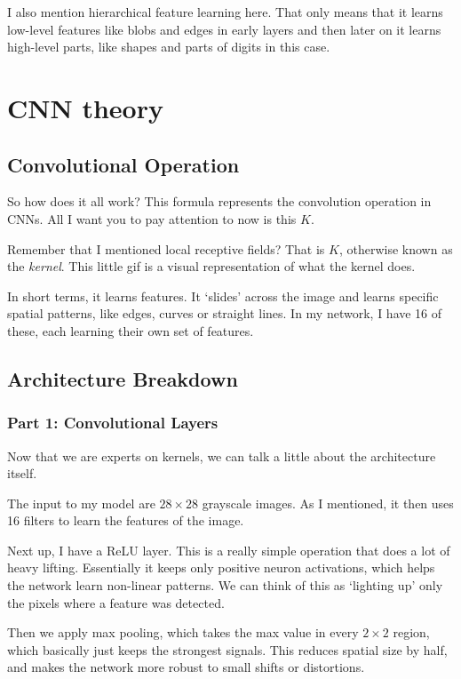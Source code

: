\documentclass{article}
\begin{document}
I also mention hierarchical feature learning here. That only means that it learns low-level features like blobs and edges in early layers and then later on it learns high-level parts, like shapes and parts of digits in this case. 

\section{CNN theory}

\subsection{Convolutional Operation}

So how does it all work? This formula represents the convolution operation in CNNs. All I want you to pay attention to now is this $K $. 

Remember that I mentioned local receptive fields? That is $K $, otherwise known as the \textit{kernel}. This little gif is a visual representation of what the kernel does. 

In short terms, it learns features. It `slides' across the image and learns specific spatial patterns, like edges, curves or straight lines. In my network, I have 16 of these, each learning their own set of features. 

\subsection{Architecture Breakdown}

\subsubsection{Part 1: Convolutional Layers}

Now that we are experts on kernels, we can talk a little about the architecture itself. 

The input to my model are $28 \times 28$ grayscale images. As I mentioned, it then uses 16 filters to learn the features of the image. 

Next up, I have a ReLU layer. This is a really simple operation that does a lot of heavy lifting. Essentially it keeps only positive neuron activations, which helps the network learn non-linear patterns. We can think of this as `lighting up' only the pixels where a feature was detected. 

Then we apply max pooling, which takes the max value in every $2 \times 2$ region, which basically just keeps the strongest signals. This reduces spatial size by half, and makes the network more robust to small shifts or distortions. 
\end{document}
